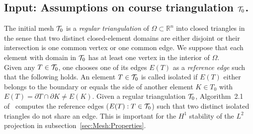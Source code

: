 \subsection{Input: Assumptions on course triangulation $\mathcal{T}_0$.}
\label{sec:mesh:input}
The initial mesh $\mathcal{T}_0$ is a \emph{regular triangulation} of $\Omega\subset\mathbb{R}^n$ into closed triangles in the sense that two distinct closed-element domains are either disjoint or their intersection is one common vertex or one common edge. We suppose that each element with domain in $\mathcal{T}_0$ has at least one vertex in the interior of $\Omega$.\\
Given any $T\in\mathcal{T}_0$, one chooses one of its edges $E(T)$ as a \emph{reference edge} such that the following holds. An element $T\in\mathcal{T}_0$ is called isolated if $E(T)$ either belongs to the boundary or equals the side of another element $K\in T_0$ with $E(T)=\partial T\cap\partial K\neq E(K)$. Given a regular triangulation $\mathcal{T}_0$, Algorithm~2.1 of~\cite{CC2004} computes the reference edges ($E(T):T\in\mathcal{T}_0$) such that two distinct isolated triangles do not share an edge. This is important for the $H^1$ stability of the $L^2$ projection in subsection~\ref{sec:Mesh:Properties}.

